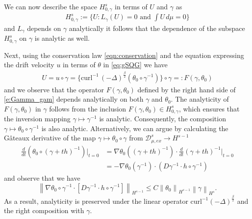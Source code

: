 \documentclass[11pt]{amsart}
\numberwithin{equation}{section}
\begin{document}
   We can now describe the space $H_{0,\gamma}^s$ in terms of $U$ and $\gamma$ as
       \begin{align}
            H_{0,\gamma}^s:=\Big\{ U: L_\gamma(U)=0 \text{ and }\int U \,d\mu=0 \Big\}
    \end{align}
    and $L_\gamma$ depends on $\gamma $ analytically it follows that the dependence of the subspace $H_{0,\gamma}^s$ on $\gamma$ is analytic as well.  
    
    Next, using the conservation law \eqref{eqn:conservation} and the equation expressing the drift velocity $u$ in terms of $\theta$ in \eqref{eq:gSQG} we have
    \begin{align}\label{e:Gamma_gam}
    U=u\circ \gamma=\big\{\text{curl}^{-1}\,\left(-\Delta\right)^{\frac{\beta}{2}}(\theta_0\circ \gamma^{-1})\big\}\circ\gamma=: F(\gamma,\theta_0)
    \end{align}
       and we observe that the operator $F(\gamma,\theta_0)$ defined by the right hand side of \eqref{e:Gamma_gam} depends analytically on both $\gamma$ and $\theta_0$.
       The analyticity of $F(\gamma, \theta_0)$ in $ \gamma $ follows from the inclusion $ F(\gamma, \theta_0) \in H_{0,\gamma}^s$, which ensures that the inversion mapping $\gamma \mapsto \gamma^{-1}$ is analytic. Consequently, the composition $\gamma \mapsto \theta_0 \circ \gamma^{-1}$ is also analytic. Alternatively, we can argue by calculating the G\^ateaux derivative of the map $\gamma\mapsto \theta_0\circ \gamma$ from $\mathcal{D}_{\mu,ex}^s\rightarrow H^{s-1}$
\begin{align}
    \frac{d}{dt}(\theta_0\circ (\gamma+th)^{-1})\Big|_{t=0}&=\nabla\theta_0((\gamma+th)^{-1})\cdot \frac{d}{dt} (\gamma+th)^{-1}\Big|_{t=0}\\
    &=-\nabla\theta_0(\gamma^{-1})\cdot(D\gamma^{-1}\cdot h\circ\gamma^{-1})
\end{align}
and observe that we have
\[
\left\| \nabla \theta_0 \circ \gamma^{-1} \cdot \left[ D \gamma^{-1} \cdot h\circ\gamma^{-1} \right] \right\|_{H^{s-1}}
\leq C \left\|  \theta_0 \right\|_{H^{s-1}} \left\| \gamma \right\|_{H^{s}}.
\]
       As a result, analyticity is preserved under the linear operator $ \text{curl}^{-1} \left(-\Delta\right)^{\frac{\beta}{2}}$ and the right composition with $\gamma$.
\end{document}
